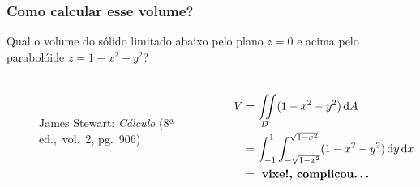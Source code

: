 \documentclass[pdftex, brazil, aspectratio=169]{beamer}
\newcommand*\diff{\mathop{}\!\mathrm{d}}
\begin{document}
\begin{frame}[t]
  \frametitle{Como calcular esse volume?}
  Qual o volume do sólido limitado abaixo pelo plano $z = 0$ 
  e acima pelo parabolóide $z = 1 - x^2 - y^2$?
  \begin{columns}
    \centering
  \begin{figure}[H]
    \begin{center}
      \label{fig:int2-04}
      \\
      \footnotesize{James Stewart: \emph{Cálculo} (8ª ed.,\ vol.\ 2, pg.\ 906)}
    \end{center}
  \end{figure}
  \begin{equation}
    \begin{split}
      V &= \iint\displaylimits_D (1-x^2-y^2) \diff A\\
        &= \int_{-1}^1 \int_{-\sqrt{1-x^2}}^{\sqrt{1-x^2}}(1-x^2-y^2)
      \diff y \diff x\\
        &=\ \text{\textbf{vixe!, complicou\ldots}}
    \end{split}
  \end{equation}
  \end{columns}
\end{frame}
\end{document}
